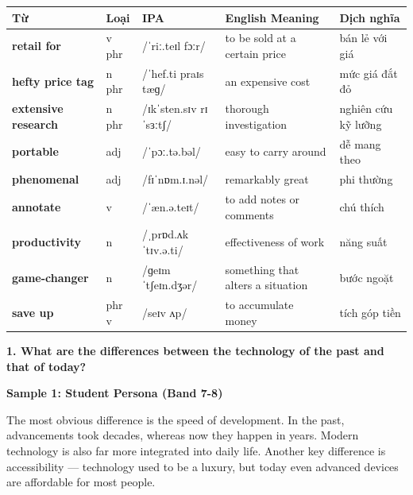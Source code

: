 \vspace{0.8em}
\begin{center}
\renewcommand{\arraystretch}{1.65}
\begin{tabularx}{\textwidth}{|V{0.22\textwidth}|C{0.07\textwidth}|I{0.20\textwidth}|Y|V{0.18\textwidth}|}
\hline
{}
\textbf{Từ} & \textbf{Loại} & \textbf{IPA} & \textbf{English Meaning} & \textbf{Dịch nghĩa} \\
\hline
\textbf{retail for} & v phr & /ˈriː.teɪl fɔːr/ & to be sold at a certain price & bán lẻ với giá \\ \hline
\textbf{hefty price tag} & n phr & /ˈhef.ti praɪs tæɡ/ & an expensive cost & mức giá đắt đỏ \\ \hline
\textbf{extensive research} & n phr & /ɪkˈsten.sɪv rɪˈsɜːtʃ/ & thorough investigation & nghiên cứu kỹ lưỡng \\ \hline
\textbf{portable} & adj & /ˈpɔː.tə.bəl/ & easy to carry around & dễ mang theo \\ \hline
\textbf{phenomenal} & adj & /fɪˈnɒm.ɪ.nəl/ & remarkably great & phi thường \\ \hline
\textbf{annotate} & v & /ˈæn.ə.teɪt/ & to add notes or comments & chú thích \\ \hline
\textbf{productivity} & n & /ˌprɒd.ʌkˈtɪv.ə.ti/ & effectiveness of work & năng suất \\ \hline
\textbf{game-changer} & n & /ɡeɪm ˈtʃeɪn.dʒər/ & something that alters a situation & bước ngoặt \\ \hline
\textbf{save up} & phr v & /seɪv ʌp/ & to accumulate money & tích góp tiền \\ \hline
\end{tabularx}
\end{center}

\partthreeheader

\begin{ieltsquestion}
\textbf{1. What are the differences between the technology of the past and that of today?}
\end{ieltsquestion}
\textbf{Sample 1: Student Persona (Band 7-8)}

The most obvious difference is the speed of development. In the past, advancements took decades, whereas now they happen in years. Modern technology is also far more integrated into daily life. Another key difference is accessibility — technology used to be a luxury, but today even advanced devices are affordable for most people.

